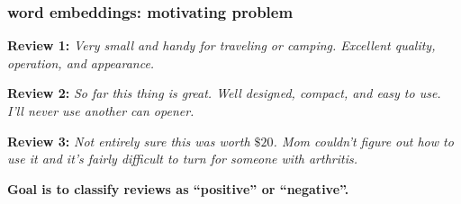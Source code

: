 \documentclass[handout,compress]{beamer}
\begin{document}
\begin{frame}
	\frametitle{word embeddings: motivating problem}
	
		\textbf{Review 1:} \textit{Very small and handy for traveling or camping. Excellent quality, operation, and appearance.}
		
		\textbf{Review 2:} \textit{So far this thing is great. Well designed, compact, and easy to use. I’ll never use another can opener.} 
	
		\textbf{Review 3:} \textit{Not entirely sure this was worth $\$20$. Mom couldn't figure out how to use it and it's fairly difficult to turn for someone with arthritis.}
	
	\begin{center}
		\textbf{\alert{Goal is to classify reviews as ``positive'' or ``negative''.}}
	\end{center}
\end{frame}
\end{document}
